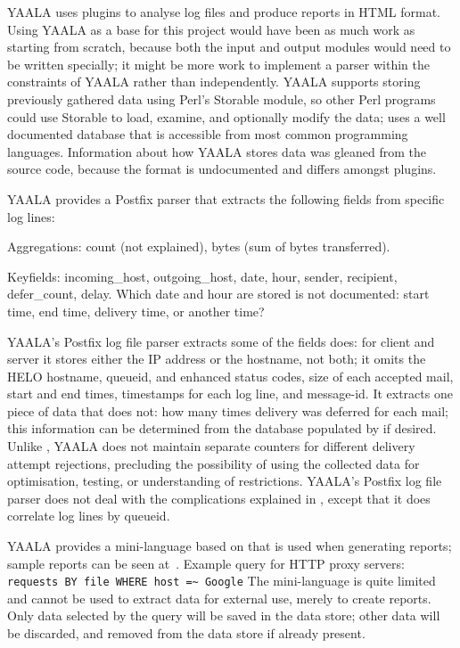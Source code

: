 YAALA uses plugins to analyse log files and produce reports in HTML format.
Using YAALA as a base for this project would have been as much work as
starting from scratch, because both the input and output modules would need
to be written specially; it might be more work to implement a parser within
the constraints of YAALA rather than independently.  YAALA supports storing
previously gathered data using Perl's Storable module, so other Perl
programs could use Storable to load, examine, and optionally modify the
data; \parsername{} uses a well documented database that is accessible from
most common programming languages.  Information about how YAALA stores data
was gleaned from the source code, because the format is undocumented and
differs amongst plugins.

YAALA provides a Postfix parser that extracts the following fields from
specific log lines:

\begin{boldeqlist}

    \item [Aggregations:] count (not explained), bytes (sum of bytes
        transferred).

    \item [Keyfields:] incoming\_host, outgoing\_host, date, hour, sender,
        recipient, defer\_count, delay.  Which date and hour are stored is
        not documented: start time, end time, delivery time, or another
        time?

\end{boldeqlist}

YAALA's Postfix log file parser extracts some of the fields \parsername{}
does: for client and server it stores either the IP address or the
hostname, not both; it omits the HELO hostname, queueid,  and
enhanced status codes, size of each accepted mail, start and end times,
timestamps for each log line, and message-id\@.  It extracts one piece of
data that \parsername{} does not: how many times delivery was deferred for
each mail; this information can be determined from the database populated
by \parsername{} if desired.  Unlike \parsername{}, YAALA does not maintain
separate counters for different delivery attempt rejections, precluding the
possibility of using the collected data for optimisation, testing, or
understanding of restrictions.  YAALA's Postfix log file parser does not
deal with the complications explained in , except
that it does correlate log lines by queueid.

YAALA provides a mini-language based on  that is used when
generating reports; sample reports can be seen
at~.  Example
query for HTTP proxy servers: \newline{} \tab{} \texttt{requests BY file
WHERE host =\~{} Google} \newline{} The mini-language is quite limited and
cannot be used to extract data for external use, merely to create reports.
Only data selected by the query will be saved in the data store; other data
will be discarded, and removed from the data store if already present.

